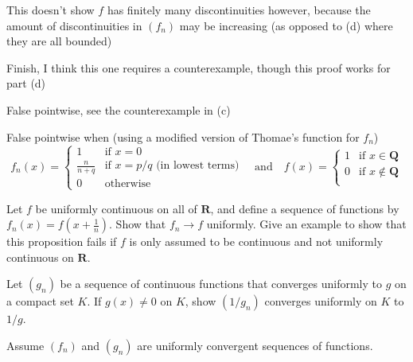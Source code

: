 \begin{solution}
{    This doesn't show $f$ has finitely many discontinuities however, because the amount of discontinuities in $(f_n)$ may be increasing (as opposed to (d) where they are all bounded)

    \TODO Finish, I think this one requires a counterexample, though this proof works for part (d)
  \item False pointwise, see the counterexample in (c)
    \TODO
  \item False pointwise when (using a modified version of Thomae's function for $f_n$)
    $$
    f_n(x) = \begin{cases}
      1 &\text{if $x = 0$} \\
      \frac{n}{n+q} &\text{if $x = p/q$ (in lowest terms)} \\
      0 &\text{otherwise}
    \end{cases}
    \quad\text{and}\quad
    f(x) = \begin{cases}
      1 &\text{if $x \in \mathbf{Q}$} \\
      0 &\text{if $x \notin \mathbf{Q}$} \\
    \end{cases}
    $$
    \TODO
  }
\end{solution}
\begin{exercise}
  Let $f$ be uniformly continuous on all of $\mathbf{R}$, and define a sequence of functions by $f_{n}(x)=f\left(x+\frac{1}{n}\right)$. Show that $f_{n} \rightarrow f$ uniformly. Give an example to show that this proposition fails if $f$ is only assumed to be continuous and not uniformly continuous on $\mathbf{R}$.

\end{exercise}
\begin{solution}
  \TODO
\end{solution}
\begin{exercise}
  Let $\left(g_{n}\right)$ be a sequence of continuous functions that converges uniformly to $g$ on a compact set $K$. If $g(x) \neq 0$ on $K$, show $\left(1 / g_{n}\right)$ converges uniformly on $K$ to $1 / g$.

\end{exercise}
\begin{solution}
  \TODO
\end{solution}
\begin{exercise}
  Assume $\left(f_{n}\right)$ and $\left(g_{n}\right)$ are uniformly convergent sequences of functions.
\end{exercise}
